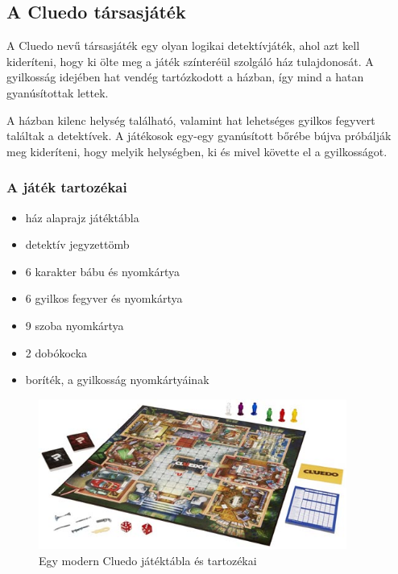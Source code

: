 \subsection{A Cluedo társasjáték}
A Cluedo nevű társasjáték egy olyan logikai detektívjáték, ahol azt kell kideríteni,
hogy ki ölte meg a játék színteréül szolgáló ház tulajdonosát. A gyilkosság idejében
hat vendég tartózkodott a házban, így mind a hatan gyanúsítottak lettek.

A házban kilenc helység található, valamint hat lehetséges gyilkos fegyvert találtak
a detektívek. A játékosok egy-egy gyanúsított bőrébe bújva próbálják meg kideríteni,
hogy melyik helységben, ki és mivel követte el a gyilkosságot.

\subsubsection{A játék tartozékai}
\begin{itemize}
  \item ház alaprajz játéktábla
  \item detektív jegyzettömb
  \item 6 karakter bábu és nyomkártya
  \item 6 gyilkos fegyver és nyomkártya
  \item 9 szoba nyomkártya
  \item 2 dobókocka
  \item boríték, a gyilkosság nyomkártyáinak
\end{itemize}

\begin{figure}[h!]
  \centering
  \includegraphics[width=0.9\textwidth]{user-documentation/images/cluedo.jpg}
  \caption[]{Egy modern Cluedo játéktábla és tartozékai\footnotemark}
\end{figure}

